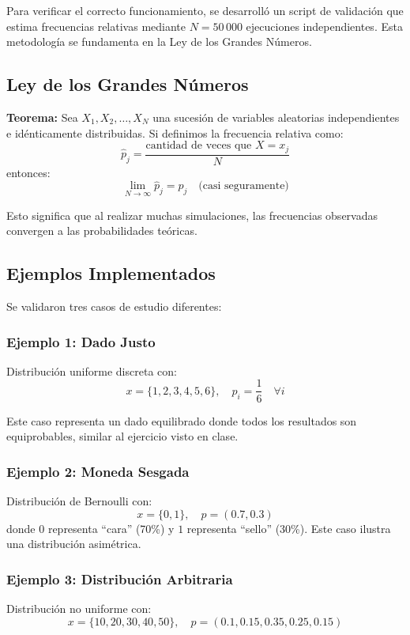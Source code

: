 \documentclass{article}
\begin{document}
    Para verificar el correcto funcionamiento, se desarrolló un script de validación que estima frecuencias relativas mediante $N = 50\,000$ ejecuciones independientes. Esta metodología se fundamenta en la Ley de los Grandes Números.
    
    \subsection*{Ley de los Grandes Números}
    
    \textbf{Teorema:} Sea $X_1, X_2, \ldots, X_N$ una sucesión de variables aleatorias independientes e idénticamente distribuidas. Si definimos la frecuencia relativa como:
    $$ \hat{p}_j = \frac{\text{cantidad de veces que } X = x_j}{N} $$
    entonces:
    $$ \lim_{N \to \infty} \hat{p}_j = p_j \quad \text{(casi seguramente)} $$
    
    Esto significa que al realizar muchas simulaciones, las frecuencias observadas convergen a las probabilidades teóricas.
    
    \subsection*{Ejemplos Implementados}
    
    Se validaron tres casos de estudio diferentes:
    
    \subsubsection*{Ejemplo 1: Dado Justo}
    Distribución uniforme discreta con:
    $$ x = \{1, 2, 3, 4, 5, 6\}, \quad p_i = \frac{1}{6} \quad \forall i $$
    
    Este caso representa un dado equilibrado donde todos los resultados son equiprobables, similar al ejercicio visto en clase.
    
    \subsubsection*{Ejemplo 2: Moneda Sesgada}
    Distribución de Bernoulli con:
    $$ x = \{0, 1\}, \quad p = (0.7, 0.3) $$
    donde $0$ representa ``cara'' (70\%) y $1$ representa ``sello'' (30\%). Este caso ilustra una distribución asimétrica.
    
    \subsubsection*{Ejemplo 3: Distribución Arbitraria}
    Distribución no uniforme con:
    $$ x = \{10, 20, 30, 40, 50\}, \quad p = (0.1, 0.15, 0.35, 0.25, 0.15) $$
    
\end{document}
